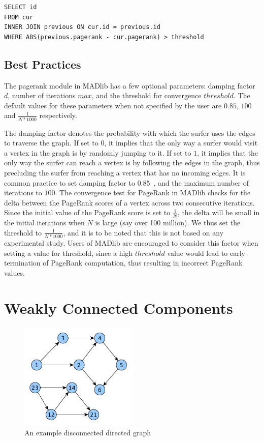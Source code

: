 \begin{algorithm}
\label{alg:pagerank:update}
\begin{lstlisting}
SELECT id
FROM cur
INNER JOIN previous ON cur.id = previous.id
WHERE ABS(previous.pagerank - cur.pagerank) > threshold
\end{lstlisting}
\end{algorithm}

\subsection{Best Practices} \label{sec:pagerank:bestpractices}

The pagerank module in MADlib has a few optional parameters: damping factor
$d$, number of iterations $max$, and the threshold for convergence $threshold$.
The default values for these parameters when not specified by the user are
$0.85$, $100$ and $\frac{1}{N*1000}$ respectively.

The damping factor denotes the probability with which the surfer uses the edges
to traverse the graph. If set to $0$, it implies that the only way a surfer
would visit a vertex in the graph is by randomly jumping to it. If set to
$1$, it implies that the only way the surfer can reach a vertex is by following
the edges in the graph, thus precluding the surfer from reaching a vertex
that has no incoming edges. It is common practice to set damping factor
to $0.85$~\cite{pagerank}, and the maximum number of iterations to $100$.
The convergence test for PageRank in MADlib checks for the delta between
the PageRank scores of a vertex across two consecutive iterations. Since
the initial value of the PageRank score is set to $\frac{1}{N}$, the delta
will be small in the initial iterations when $N$ is large (say over 100
million). We thus set the threshold to $\frac{1}{N*1000}$, and it is to be
noted that this is not based on any experimental study. Users of MADlib are
encouraged to consider this factor when setting a value for threshold, since
a high $threshold$ value would lead to early termination of PageRank
computation, thus resulting in incorrect PageRank values.


\section{Weakly Connected Components} \label{sec:graph:wcc}
\begin{figure}[h]
    \centering
    \includegraphics[width=0.5\textwidth]{figures/wcc_example.pdf}
\caption{An example disconnected directed graph}
\label{wcc:example}
\end{figure}


